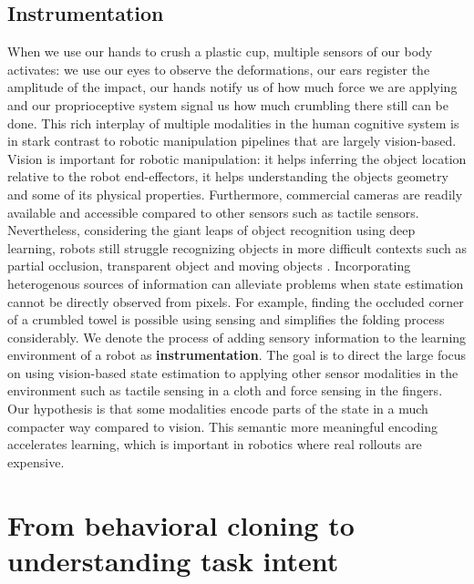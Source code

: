 \documentclass[\home/main.tex]{subfiles}
\begin{document}
\subsection{Instrumentation}
When we use our hands to crush a plastic cup, multiple sensors of our body activates: we use our eyes to observe the deformations, our ears register the amplitude of the impact, our hands notify us of how much force we are applying and our proprioceptive system signal us how much crumbling there still can be done. This rich interplay of multiple modalities in the human cognitive system is in stark contrast to robotic manipulation pipelines that are largely vision-based.  Vision is important for robotic manipulation: it helps inferring the object location relative to the robot end-effectors, it helps understanding the objects geometry and some of its physical properties. Furthermore, commercial cameras are readily available and accessible compared to other sensors such as tactile sensors. Nevertheless, considering the giant leaps of object recognition using deep learning, robots still struggle recognizing objects in more difficult contexts such as partial occlusion, transparent object and moving objects \autocite{Guo2014,sajjan2019cleargrasp,Ojha2015}. 
Incorporating heterogenous sources of information can alleviate problems when state estimation cannot be directly observed from pixels. For example, finding the occluded corner of a crumbled towel is possible using sensing and simplifies the folding process considerably. 
We denote the process of adding sensory information to the learning environment of a robot as \textbf{instrumentation}. The goal is to direct the large focus on using vision-based state estimation to applying other sensor modalities in the environment such as tactile sensing in a cloth and force sensing in the fingers. Our hypothesis is that some modalities encode parts of the state in a much compacter way compared to vision. This semantic more meaningful encoding accelerates learning, which is important in robotics where real rollouts are expensive. 


\section{From behavioral cloning to understanding task intent}
\end{document}
